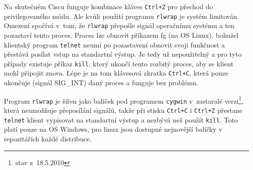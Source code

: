 Na skutečném Ciscu funguje kombinace kláves \verb|Ctrl+Z| pro přechod do privilegovaného módu. Ale kvůli použití programu \verb|rlwrap| je systém limitován. Omezení spočívá v~tom, že \verb|rlwrap| přepošle signál operačnímu systému a ten pozastaví tento proces. Proces lze obnovit příkazem fg (na OS Linux), bohužel klientský program \verb|telnet| neumí po pozastavení obnovit svoji funkčnost a přestává posílat vstup na standartní výstup. Je tedy už nepoužitelný a pro tyto případy existuje příkaz \verb|kill|, který ukončí tento rozbitý proces, aby se klient mohl připojit znova. Lépe je na tom klávesová zkratka \verb|Ctrl+C|, která pouze ukončuje (signál SIG\_INT) daný proces a funguje bez problému. 

Program \verb|rlwrap| je šířen jako balíček pod programem \verb|cygwin| v~zastaralé verzi\footnote{stav z~18.5.2010}, která neumožňuje přeposílání signálů, takže při stisku \verb|Ctrl+C| i \verb|Ctrl+Z| přestane \verb|telnet| klient vypisovat na standartní výstup a nezbývá než použít \verb|kill|. Toto platí pouze na OS Windows, pro linux jsou dostupné nejnovější balíčky v repozitářích každé distribuce.



